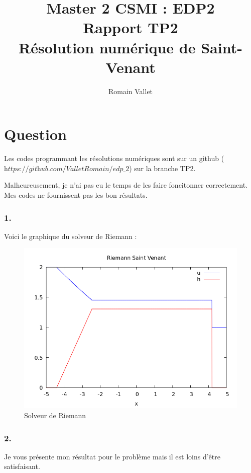 \documentclass{article}
\title{Master 2 CSMI : EDP2\\Rapport TP2\\Résolution numérique de Saint-Venant}
\author{Romain Vallet}
\begin{document}
\maketitle

\section{Question}

Les codes programmant les résolutions numériques sont sur un github ($\textit{https://github.com/ValletRomain/edp\_2}$) sur la branche TP2.

Malheureusement, je n'ai pas eu le temps de les faire foncitonner correctement. Mes codes ne fournissent pas les bon résultats.

\subsubsection*{1.}

Voici le graphique du solveur de Riemann :

\begin{figure}[H]
    \centering
    \includegraphics[scale=0.5]{figure/riemann.png}
    \caption{Solveur de Riemann}
\end{figure}

\subsubsection*{2.}

Je vous présente mon résultat pour le problème mais il est loins d'être satisfaisant.
\end{document}
